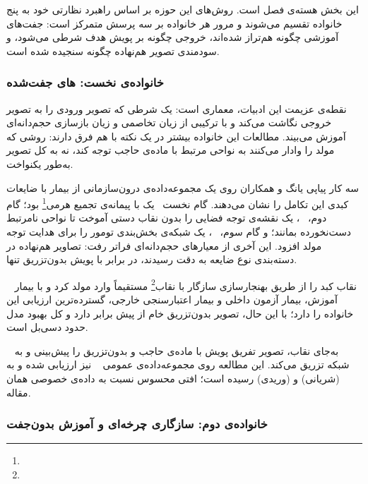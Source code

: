 این بخش هسته‌ی فصل است. روش‌های این حوزه بر اساس راهبرد نظارتی خود به پنج خانواده تقسیم می‌شوند و مرور هر خانواده بر سه پرسش متمرکز است: جفت‌های آموزشی چگونه هم‌تراز شده‌اند، خروجی چگونه بر پویش هدف شرطی می‌شود، و سودمندی تصویر هم‌نهاده چگونه سنجیده شده است.

\subsubsection*{خانواده‌ی نخست: های جفت‌شده}

نقطه‌ی عزیمت این ادبیات، معماری  است: یک  شرطی که تصویر ورودی را به تصویر خروجی نگاشت می‌کند و با ترکیبی از زیان تخاصمی و زیان بازسازی حجم‌دانه‌ای آموزش می‌بیند. مطالعات این خانواده بیشتر در یک نکته با هم فرق دارند: روشی که مولد را وادار می‌کنند به نواحی مرتبط با ماده‌ی حاجب توجه کند، نه به کل تصویر به‌طور یکنواخت.

سه کار پیاپی یانگ و همکاران روی یک مجموعه‌داده‌ی درون‌سازمانی از  بیمار با ضایعات کبدی این تکامل را نشان می‌دهند. گام نخست~\cite{Yan22} یک  با پیمانه‌ی تجمیع هرمی\footnote{} بود؛ گام دوم، ~\cite{Yan23}، یک نقشه‌ی توجه فضایی را بدون نقاب دستی آموخت تا نواحی نامرتبط دست‌نخورده بمانند؛ و گام سوم، ~\cite{Yan24c}، یک شبکه‌ی بخش‌بندی تومور را برای هدایت توجه مولد افزود. این آخری از معیارهای حجم‌دانه‌ای فراتر رفت: تصاویر هم‌نهاده در دسته‌بندی نوع ضایعه به دقت  رسیدند، در برابر  با پویش بدون‌تزریق تنها.

~\cite{Zha25} نقاب کبد را از طریق بهنجارسازی سازگار با نقاب\footnote{} مستقیماً وارد مولد کرد و با  بیمار آموزش،  بیمار آزمون داخلی و  بیمار اعتبارسنجی خارجی، گسترده‌ترین ارزیابی این خانواده را دارد؛ با این حال، تصویر بدون‌تزریق خام از پیش  برابر  دارد و کل بهبود مدل حدود  دسی‌بل است. 

~\cite{Che24} به‌جای نقاب، تصویر تفریق پویش با ماده‌ی حاجب و بدون‌تزریق را پیش‌بینی و به شبکه تزریق می‌کند. این مطالعه روی مجموعه‌داده‌ی عمومی 
~\cite{zhou2021phaserecog}
 نیز ارزیابی شده و به 
   (شریانی) و  (وریدی) رسیده است؛ افتی محسوس نسبت به داده‌ی خصوصی همان مقاله. 
 
 
\subsubsection*{خانواده‌ی دوم: سازگاری چرخه‌ای و آموزش بدون‌جفت}

